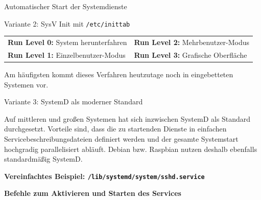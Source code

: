 {\begin{frame}[allowframebreaks]{Automatischer Start der Systemdienste}
\begin{block}{Variante 2: SysV Init mit \texttt{/etc/inittab}}
        \vfill
        \begin{center}
            \scriptsize
            \begin{tabularx}{.8\textwidth}{X X}
                    \textbf{Run Level 0:} System herunterfahren &
                    \textbf{Run Level 2:} Mehrbenutzer-Modus \\

                    \textbf{Run Level 1:} Einzelbenutzer-Modus &
                    \textbf{Run Level 3:} Grafische Oberfläche \\
            \end{tabularx}
        \end{center}

        \vfill
        \parbox{\linewidth}{
            Am häufigsten kommt dieses Verfahren heutzutage noch in eingebetteten Systemen vor.
        }

        \vfill
        
    \end{block}

    \framebreak

    \begin{block}{Variante 3: SystemD als moderner Standard}
        \smallskip
        \parbox{\linewidth}{
            Auf mittleren und großen Systemen hat sich inzwischen SystemD als Standard
            durchgesetzt. Vorteile sind, dass die zu startenden Dienste in einfachen
            Servicebeschreibungsdateien definiert werden und der gesamte Systemstart
            hochgradig parallelisiert abläuft. Debian bzw. Raspbian nutzen deshalb
            ebenfalls standardmäßig SystemD.
        }

        \bigskip
        \textbf{Vereinfachtes Beispiel: \texttt{/lib/systemd/system/sshd.service}}
        

        \smallskip
        \textbf{Befehle zum Aktivieren und Starten des Services}
        
    \end{block}
\end{frame}
}

